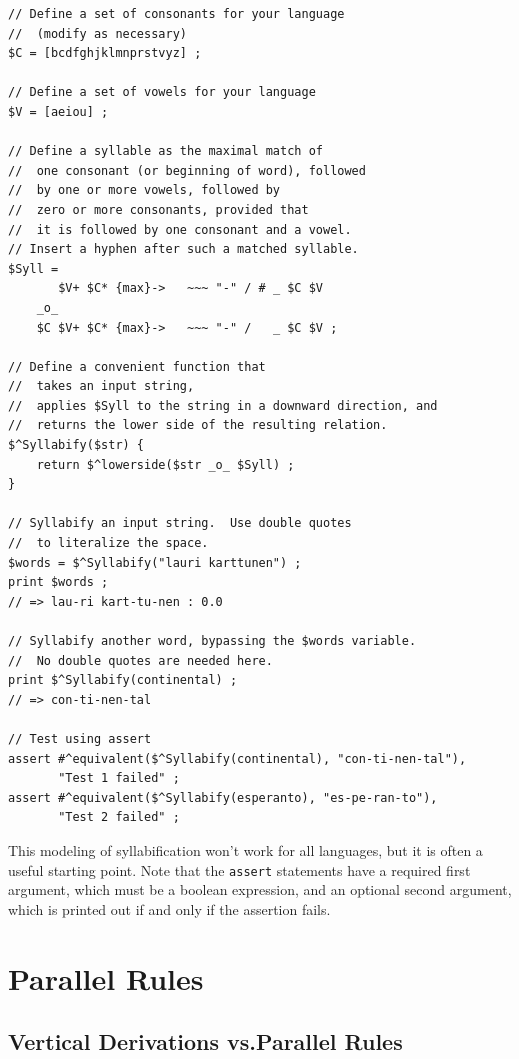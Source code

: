 \begin{Verbatim}
// Define a set of consonants for your language
// 	(modify as necessary)
$C = [bcdfghjklmnprstvyz] ;

// Define a set of vowels for your language
$V = [aeiou] ;

// Define a syllable as the maximal match of
//	one consonant (or beginning of word), followed 
//	by one or more vowels, followed by
//	zero or more consonants, provided that
//	it is followed by one consonant and a vowel.
// Insert a hyphen after such a matched syllable.
$Syll = 
	   $V+ $C* {max}->   ~~~ "-" / # _ $C $V 
	_o_
	$C $V+ $C* {max}->   ~~~ "-" /   _ $C $V ;

// Define a convenient function that 
//	takes an input string,
//	applies $Syll to the string in a downward direction, and
//	returns the lower side of the resulting relation.
$^Syllabify($str) { 
	return $^lowerside($str _o_ $Syll) ; 
}

// Syllabify an input string.  Use double quotes
//	to literalize the space.
$words = $^Syllabify("lauri karttunen") ;
print $words ;	
// => lau-ri kart-tu-nen : 0.0

// Syllabify another word, bypassing the $words variable.
//	No double quotes are needed here.
print $^Syllabify(continental) ;
// => con-ti-nen-tal

// Test using assert
assert #^equivalent($^Syllabify(continental), "con-ti-nen-tal"), 
       "Test 1 failed" ;
assert #^equivalent($^Syllabify(esperanto), "es-pe-ran-to"), 
       "Test 2 failed" ;
\end{Verbatim}

\noindent
This modeling of syllabification won't work for all languages, but it is often a
useful starting point.  Note that the \texttt{assert} statements have a
required first argument, which must be a boolean expression, and an
optional second argument, which is printed out if and only if the
assertion fails.

\section{Parallel Rules}

\subsection{Vertical Derivations vs.\@ Parallel Rules}

